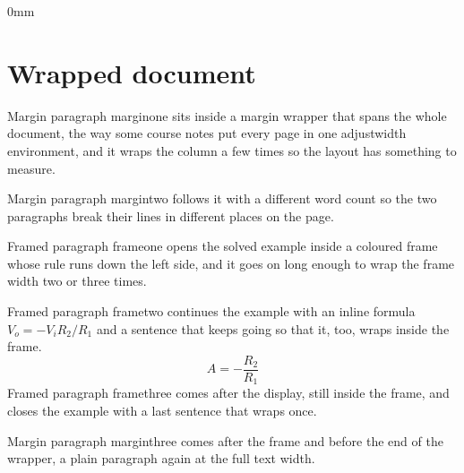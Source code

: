 \documentclass[11pt]{article}
\begin{document}
\begin{adjustwidth*}{0mm}{}

\section*{Wrapped document}

Margin paragraph marginone sits inside a margin wrapper that spans the whole document, the
way some course notes put every page in one adjustwidth environment, and it wraps the
column a few times so the layout has something to measure.

Margin paragraph margintwo follows it with a different word count so the two paragraphs
break their lines in different places on the page.

\begin{solved}[frametitle={Solved example}]
Framed paragraph frameone opens the solved example inside a coloured frame whose rule runs
down the left side, and it goes on long enough to wrap the frame width two or three times.

Framed paragraph frametwo continues the example with an inline formula $V_o = -V_i R_2/R_1$
and a sentence that keeps going so that it, too, wraps inside the frame.
\begin{equation*}
  A = -\frac{R_2}{R_1}
\end{equation*}
Framed paragraph framethree comes after the display, still inside the frame, and closes the
example with a last sentence that wraps once.
\end{solved}

Margin paragraph marginthree comes after the frame and before the end of the wrapper, a plain
paragraph again at the full text width.

\end{adjustwidth*}
\end{document}
